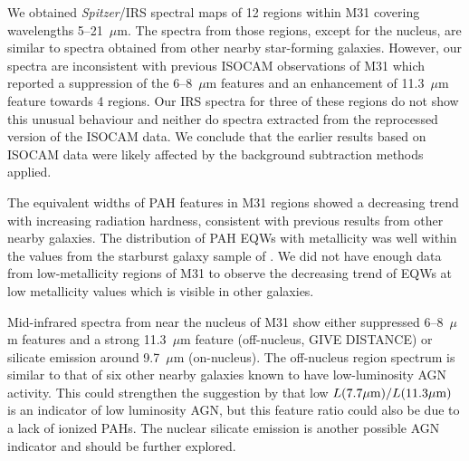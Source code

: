 We  obtained {\em Spitzer}/IRS spectral maps of 12 regions within M31 covering wavelengths 5--21~$\mu$m. 
The spectra from those regions, except for the nucleus, are similar to spectra obtained from other nearby  star-forming galaxies. 
However, our spectra are inconsistent with previous ISOCAM observations of M31 \citep{1998Cesarsky} which reported a suppression 
of the 6--8~$\mu$m features and an enhancement of 11.3~$\mu$m feature towards 4 regions. 
Our IRS spectra for three of these regions do not show this unusual behaviour and neither do spectra extracted from the reprocessed version
of the ISOCAM data.
We conclude that the earlier results based on ISOCAM data were likely affected by the background subtraction methods applied.

The equivalent widths of PAH features in M31 regions showed a decreasing trend with increasing radiation hardness, consistent with previous 
results from other nearby galaxies. The distribution of PAH EQWs with metallicity was well within the values from the starburst galaxy sample of \citet{Engelbracht_2008}. 
We did not have enough data from low-metallicity regions of M31 to observe the decreasing trend of EQWs at low metallicity values which is visible in other galaxies.

Mid-infrared spectra from near the nucleus of M31 show either suppressed 6--8~$\mu$m features and a strong 11.3~$\mu$m feature
(off-nucleus, GIVE DISTANCE) or silicate emission around 9.7~$\mu$m  (on-nucleus). The off-nucleus region spectrum is similar to that of
six other nearby galaxies known to have low-luminosity AGN activity. This could strengthen the
suggestion by \citet{Smith:2007lr} that low $L(7.7\mu{\rm m})/L(11.3\mu{\rm m})$ is an indicator of low luminosity AGN,
but this feature ratio could also be due to a lack of ionized PAHs. The nuclear silicate emission is another possible AGN indicator
and should be further explored. %
 